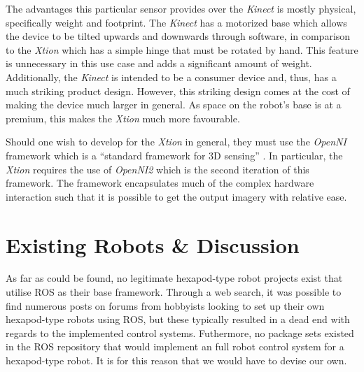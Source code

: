 The advantages this particular sensor provides over the \emph{Kinect} is mostly physical, specifically weight and footprint. The \emph{Kinect} has a motorized base which allows the device to be tilted upwards and downwards through software, in comparison to the \emph{Xtion} which has a simple hinge that must be rotated by hand. This feature is unnecessary in this use case and adds a significant amount of weight. Additionally, the \emph{Kinect} is intended to be a consumer device and, thus, has a much striking product design. However, this striking design comes at the cost of making the device much larger in general. As space on the robot's base is at a premium, this makes the \emph{Xtion} much more favourable.

Should one wish to develop for the \emph{Xtion} in general, they must use the \emph{OpenNI} framework which is a ``standard framework for 3D sensing'' \cite{openni_site}. In particular, the \emph{Xtion} requires the use of \emph{OpenNI2} which is the second iteration of this framework. The framework encapsulates much of the complex hardware interaction such that it is possible to get the output imagery with relative ease. 


\section{Existing Robots \& Discussion}

As far as could be found, no legitimate hexapod-type robot projects exist that utilise ROS as their base framework. Through a web search, it was possible to find numerous posts on forums from hobbyists looking to set up their own hexapod-type robots using ROS, but these typically resulted in a dead end with regards to the implemented control systems. Futhermore, no package sets existed in the ROS repository that would implement an full robot control system for a hexapod-type robot. It is for this reason that we would have to devise our own.